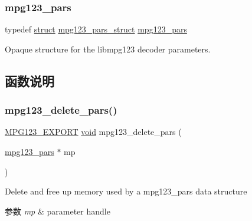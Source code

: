 \subsubsection{\texorpdfstring{mpg123\+\_\+pars}{mpg123\_pars}}
{\footnotesize\ttfamily typedef \hyperlink{interfacestruct}{struct} \hyperlink{structmpg123__pars__struct}{mpg123\+\_\+pars\+\_\+struct} \hyperlink{group__mpg123__advpar_ga3983578625af3bb6dc7e3b74d0cab4aa}{mpg123\+\_\+pars}}

Opaque structure for the libmpg123 decoder parameters. 

\subsection{函数说明}
\mbox{\label{group__mpg123__advpar_gaafc74d249a5a7a545cc6e11576ec5c78}} 
\subsubsection{\texorpdfstring{mpg123\+\_\+delete\+\_\+pars()}{mpg123\_delete\_pars()}}
{\footnotesize\ttfamily \hyperlink{mpg123_8h_a2ba98cfba3f760879df70e755b2a61cc}{M\+P\+G123\+\_\+\+E\+X\+P\+O\+RT} \hyperlink{interfacevoid}{void} mpg123\+\_\+delete\+\_\+pars (\begin{DoxyParamCaption}\item[{\hyperlink{group__mpg123__advpar_ga3983578625af3bb6dc7e3b74d0cab4aa}{mpg123\+\_\+pars} $\ast$}]{mp }\end{DoxyParamCaption})}

Delete and free up memory used by a mpg123\+\_\+pars data structure 
\begin{DoxyParams}{参数}
{\em mp} & parameter handle \\
\hline
\end{DoxyParams}
\mbox{\label{group__mpg123__advpar_ga481219fd8962c7b7ab69d4c8daebc094}} 
